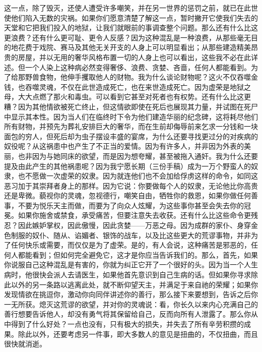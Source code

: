 这一点，除了毁灭，还使人遭受许多嘲笑，并在另一世界的惩罚之前，就已在此世使他们陷入无数的灾祸。如果你们愿意清楚了解这一点，暂时撇开它使我们失去的天堂和它把我们投入的地狱，让我们就眼前的事调查整个问题。那么还有什么比这更浪费？还有什么更可耻、更令人反感？因为这种混乱是一种浪费，从那些毫无目的地花费于戏院、赛马及其他无关开支的人身上可以明显看出；从那些建造精美昂贵的房屋，并以无用的奢华风格布置一切的人身上也可以看出，这些我不必在此详述。但一个人染上这种病必然变得奢侈、浪费、贪婪、吝啬，任何人都能看到。为了给那野兽食物，他伸手攫取他人的财物。我为什么谈论财物呢？这火不仅吞噬金钱，也吞噬灵魂，不仅在此世造成死亡，也在来世造成死亡。因为虚荣是地狱之母，大大点燃了那火和毒虫。可以看到它甚至对死者也有权势。还有什么比这更糟？因为其他情欲被死亡终止，但这情欲即使在死后也展现其力量，并试图在死尸中显示其本性。因为当人们在临终时下令为他们建造华丽的纪念碑，这将耗尽他们所有财物，并预先为葬礼安排巨大的奢华，而在生前却侮辱前来乞求一分钱和一块面包的穷人，但死后却为虫子摆设丰盛的宴席，为什么还要寻找更过分的对疾病的奴役呢？从这祸患中也产生了不正当的爱情。因为有许多人，并非因为外表的美丽，也非因为与她同床的欲望，而是因为想夸耀，甚至被拖入通奸。我为什么还要提及由此产生的其他祸患呢？因为我宁愿长期（三份手稿）成为一万个野蛮人的奴隶，也不愿做一次虚荣的奴隶。因为就连他们也不会加给俘虏这样的命令，如同这恶习加于其崇拜者身上的那样。因为它说：你要做每个人的奴隶，无论他比你高贵还是卑微。藐视你的灵魂，忽视德行，嘲笑自由，牺牲你的救恩，如果你做任何善事，不要为悦乐天主而做，而要为了向众人炫耀，为这些事你甚至会失去你的冠冕。如果你施舍或禁食，承受痛苦，但要注意失去收获。还有什么比这些命令更残忍？因此嫉妒掌权，因此傲慢，因此贪婪——万恶之母。因为成群的家仆、身穿金色制服的奴仆、随从、谄媚者、银饰的战车，以及比这些更大的荒谬事物，并非为了任何快乐或需要，而仅仅是为了虚荣。是的，有人会说，这种痛苦是邪恶的，任何人都能看到；但如何完全避免它，这才是你应当告诉我们的。那么，首先，如果你说服自己这种混乱是有害的，你就为纠正它开了一个很好的头。因为当一个人生病时，他很快会派人去请医生，如果他首先意识到自己生病的话。但如果你寻求除此以外的另一条路以逃离此处，就不断仰望天主，并满足于来自祂的荣耀；如果你发现情欲在挑逗你，激动你向同伴讲述你的善行，那么接下来要想到，告诉之后你一无所获。熄灭这荒谬的欲望，并对你的灵魂说：看，你长久以来内心充满自己的善行想要告诉他人，却没有勇气将其保留给自己，反而向所有人泄露了。那么你从中得到了什么好处？一点也没有，只有极大的损失，并失去了所有辛劳积攒的成果。除此以外，还要考虑另一件事，即大多数人的意见是扭曲的，不仅扭曲，而且很快就消逝。\par

